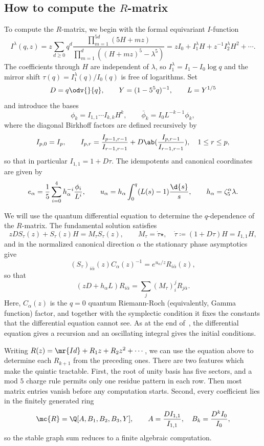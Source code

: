 \subsection{How to compute the \(R\)-matrix}%
\label{sub:How to compute the R-matrix (Guo)}

To compute the \(R\)-matrix, we begin with the formal equivariant \(I\)-function
\[ I^{\lambda}(q,z) = z\sum_{d\geq0}q^d \frac{\prod_{m=1}^{5d}(5H+mz)}{\prod_{m=1}^d ((H+mz)^5 - \lambda^5)} = zI_0 + I_1^{\lambda}H + z^{-1}I_2^{\lambda}H^2 + \cdots. \]
The coefficients through \(H\) are independent of \(\lambda\), so \(I_1^{\lambda} = I_1 - I_0 \log q\) and the mirror shift \(\tau(q) = I_1^{\lambda}(q)/I_0(q)\) is free of logarithms. Set
\[ D = q\odv{}{q}, \qquad Y = (1-5^5q)^{-1}, \qquad L = Y^{1/5} \]
and introduce the bases
\[ \phi_k = I_{1,1}\cdots I_{k,k}H^k, \qquad \bar{\phi}_k = I_0 L^{-k-1}\phi_k, \]
where the diagonal Birkhoff factors are defined recursively by
\[ I_{p,0} = I_p, \qquad I_{p,r} = \frac{I_{p-1,r-1}}{I_{r-1,r-1}} + D \ab( \frac{I_{p,r-1}}{I_{r-1,r-1}}), \quad 1 \leq r \leq p, \]
so that in particular \(I_{1,1} = 1+D\tau\). The idempotents and canonical coordinates are given by
\[ e_{\alpha} = \frac{1}{5}\sum_{i=0}^4 h_{\alpha}^{-i}\frac{\phi_i}{L^i}, \qquad u_{\alpha} = h_{\alpha}\int_0^q (L(s)-1)\frac{\d{s}}{s}, \qquad h_{\alpha} = \zeta_5^{\alpha}\lambda. \]

We will use the quantum differential equation to determine the \(q\)-dependence of the \(R\)-matrix. The fundamental solution satisfies
\[ zDS_{\tau}(z) + S_{\tau}(z)H = M_{\tau}S_{\tau}(z), \qquad M_{\tau} = \dot{\tau}\star, \quad \dot{\tau} \coloneqq (1+D\tau)H = I_{1,1}H, \]
and in the normalized canonical direction \(\alpha\) the stationary phase asymptotics give
\[ (S_{\tau})_{i\bar{\alpha}}(z)C_{\alpha}(z)^{-1} = e^{u_{\alpha}/z}R_{i\bar{\alpha}}(z), \]
so that
\[ (zD+h_{\alpha}L)R_{i\bar{\alpha}} = \sum_j (M_{\tau})_i^j R_{j\bar{\alpha}}. \]
Here, \(C_{\alpha}(z)\) is the \(q=0\) quantum Riemann-Roch (equivalently, Gamma function) factor, and together with the symplectic condition it fixes the constants that the differential equation cannot see. As at the end of~, the differential equation gives a recursion and an oscillating integral gives the initial conditions.

Writing \(R(z) = \mr{Id} + R_1 z + R_2 z^2 + \cdots\), we can use the equation above to determine each \(R_{k+1}\) from the preceding ones. There are two features which make the quintic tractable. First, the root of unity basis has five sectors, and a mod \(5\) charge rule permits only one residue pattern in each row. Then most matrix entries vanish before any computation starts. Second, every coefficient lies in the finitely generated ring
\[ \mc{R} = \Q[A,B_1,B_2,B_3,Y], \qquad A = \frac{DI_{1,1}}{I_{1,1}}, \quad B_k = \frac{D^k I_0}{I_0}, \]
so the stable graph sum reduces to a finite algebraic computation.

